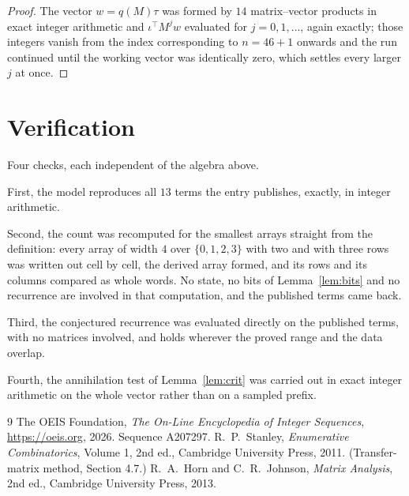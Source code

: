 \documentclass[11pt,a4paper]{article}
\theoremstyle{plain}
\theoremstyle{definition}
\begin{document}
\begin{proof}
The vector $w=q(M)\tau$ was formed by $14$ matrix--vector products in exact integer
arithmetic and $\iota^{\!\top}M^{j}w$ evaluated for $j=0,1,\dots$, again exactly; those
integers vanish from the index corresponding to $n=46+1$ onwards and the run continued
until the working vector was identically zero, which settles every larger $j$ at once.
\end{proof}

\section{Verification}

Four checks, each independent of the algebra above.

First, the model reproduces all $13$ terms the entry publishes, exactly, in integer
arithmetic.

Second, the count was recomputed for the smallest arrays straight from the definition: every
array of width $4$ over $\{0,1,2,3\}$ with two and with three rows was written out cell by cell,
the derived array formed, and its rows and its columns compared as whole words. No state, no
bits of Lemma~\ref{lem:bits} and no recurrence are involved in that computation, and the
published terms came back.

Third, the conjectured recurrence was evaluated directly on the published terms, with no
matrices involved, and holds wherever the proved range and the data overlap.

Fourth, the annihilation test of Lemma~\ref{lem:crit} was carried out in exact integer
arithmetic on the whole vector rather than on a sampled prefix.

\begin{thebibliography}{9}
 The OEIS Foundation, \emph{The On-Line Encyclopedia of Integer
Sequences}, \url{https://oeis.org}, 2026. Sequence A207297.
 R.~P.~Stanley, \emph{Enumerative Combinatorics}, Volume 1, 2nd ed.,
Cambridge University Press, 2011. (Transfer-matrix method, Section 4.7.)
 R.~A.~Horn and C.~R.~Johnson, \emph{Matrix Analysis}, 2nd ed., Cambridge
University Press, 2013.
\end{thebibliography}
\end{document}
